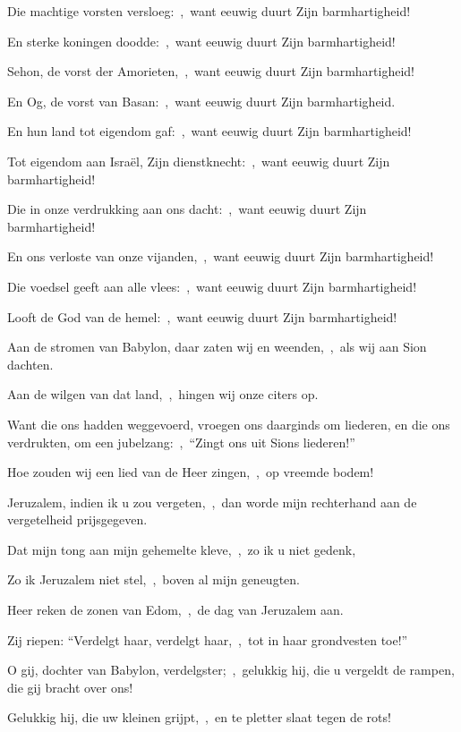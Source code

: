\documentclass[12pt,twoside,a5paper]{article}
\begin{document}
\begin{halfparskip}
  Die machtige vorsten versloeg:~\sep\ want eeuwig duurt Zijn barmhartigheid!

  En sterke koningen doodde:~\sep\ want eeuwig duurt Zijn barmhartigheid!

  Sehon, de vorst der Amorieten,~\sep\ want eeuwig duurt Zijn barmhartigheid!

  En Og, de vorst van Basan:~\sep\ want eeuwig duurt Zijn barmhartigheid.

  En hun land tot eigendom gaf:~\sep\ want eeuwig duurt Zijn barmhartigheid!

  Tot eigendom aan Israël, Zijn dienstknecht:~\sep\ want eeuwig duurt Zijn barmhartigheid!

  Die in onze verdrukking aan ons dacht:~\sep\ want eeuwig duurt Zijn barmhartigheid!

  En ons verloste van onze vijanden,~\sep\ want eeuwig duurt Zijn barmhartigheid!

  Die voedsel geeft aan alle vlees:~\sep\ want eeuwig duurt Zijn barmhartigheid!

  Looft de God van de hemel:~\sep\ want eeuwig duurt Zijn barmhartigheid!
\end{halfparskip}


\begin{halfparskip}
  Aan de stromen van Babylon, daar zaten wij en weenden,~\sep\ als wij aan Sion dachten.


  Aan de wilgen van dat land,~\sep\ hingen wij onze citers op.

  Want die ons hadden weggevoerd, vroegen ons daarginds om liederen, en die ons verdrukten, om een jubelzang:~\sep\ ``Zingt ons uit Sions liederen!''

  Hoe zouden wij een lied van de Heer zingen,~\sep\ op vreemde bodem!

  Jeruzalem, indien ik u zou vergeten,~\sep\ dan worde mijn rechterhand aan de vergetelheid prijsgegeven.

  Dat mijn tong aan mijn gehemelte kleve,~\sep\ zo ik u niet gedenk,

  Zo ik Jeruzalem niet stel,~\sep\ boven al mijn geneugten.

  Heer reken de zonen van Edom,~\sep\ de dag van Jeruzalem aan.

  Zij riepen: ``Verdelgt haar, verdelgt haar,~\sep\ tot in haar grondvesten toe!''

  O gij, dochter van Babylon, verdelgster;~\sep\ gelukkig hij, die u vergeldt de rampen, die gij bracht over ons!

  Gelukkig hij, die uw kleinen grijpt,~\sep\ en te pletter slaat tegen de rots!
\end{halfparskip}
\end{document}
